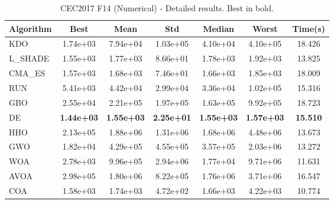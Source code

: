 \begin{table}[H]
\centering\small
\caption{CEC2017 F14 (Numerical) - Detailed results. Best in bold.}
\label{tab:cec2017_F14}
\begin{tabular}{lcccccc}
\toprule
\textbf{Algorithm} & \textbf{Best} & \textbf{Mean} & \textbf{Std} & \textbf{Median} & \textbf{Worst} & \textbf{Time(s)} \\
\midrule
KDO & 1.74e+03 & 7.94e+04 & 1.03e+05 & 4.10e+04 & 4.10e+05 & 18.426 \\
L_SHADE & 1.55e+03 & 1.77e+03 & 8.66e+01 & 1.78e+03 & 1.92e+03 & 13.825 \\
CMA_ES & 1.57e+03 & 1.68e+03 & 7.46e+01 & 1.66e+03 & 1.85e+03 & 18.009 \\
RUN & 5.41e+03 & 4.42e+04 & 2.99e+04 & 3.36e+04 & 1.02e+05 & 15.316 \\
GBO & 2.55e+04 & 2.21e+05 & 1.97e+05 & 1.63e+05 & 9.92e+05 & 18.723 \\
DE & \textbf{1.44e+03} & \textbf{1.55e+03} & \textbf{2.25e+01} & \textbf{1.55e+03} & \textbf{1.57e+03} & \textbf{15.510} \\
HHO & 2.13e+05 & 1.88e+06 & 1.31e+06 & 1.68e+06 & 4.48e+06 & 13.673 \\
GWO & 1.82e+04 & 4.29e+05 & 4.55e+05 & 3.57e+05 & 2.03e+06 & 13.272 \\
WOA & 2.78e+03 & 9.96e+05 & 2.94e+06 & 1.77e+04 & 9.71e+06 & 11.631 \\
AVOA & 2.98e+05 & 1.80e+06 & 8.22e+05 & 1.76e+06 & 3.71e+06 & 16.547 \\
COA & 1.58e+03 & 1.74e+03 & 4.72e+02 & 1.66e+03 & 4.22e+03 & 10.774 \\
\bottomrule
\end{tabular}
\end{table}

